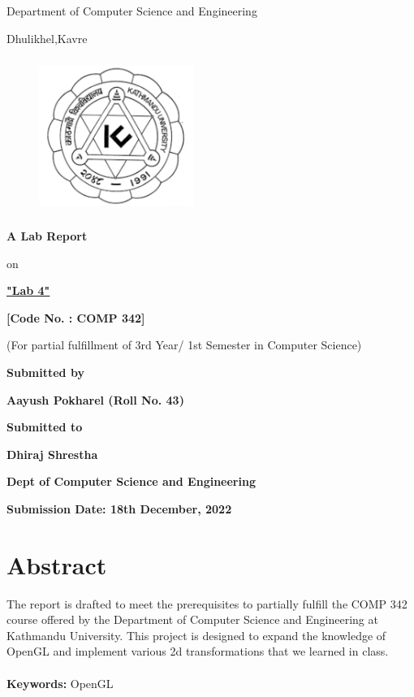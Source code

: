 \documentclass[12pt]{article}
\begin{document}
\thispagestyle{empty}

\section*{}
 {\LARGE{}}

\centerline{Department of Computer Science and Engineering}
\centerline{Dhulikhel,Kavre}
\begin{figure}[h]
    \centerline{\includegraphics[width=50.546mm,height=50.546mm]{KU_Logo.png}}
\end{figure}

\centerline{\textbf{A Lab Report}}
\centerline{on}
\centerline{\underline{\textbf{"Lab 4"}}}

\vspace*{12mm}

\centerline{\textbf{[Code No. : COMP 342]}}
\centerline{(For partial fulfillment of 3rd Year/ 1st Semester in Computer Science)}

\vspace*{20mm}

\centerline{\textbf{Submitted by}}
\centerline{\textbf{Aayush Pokharel (Roll No. 43)}}


\vspace*{26mm}


\centerline{\textbf{Submitted to}}
\centerline{\textbf{Dhiraj Shrestha}}
\centerline{\textbf{Dept of Computer Science and Engineering}}

\vspace*{20mm}

\centerline{\textbf{Submission Date: 18th December, 2022}}



\clearpage
\thispagestyle{empty}


\section*{Abstract}
The report is drafted to meet the prerequisites to partially fulfill the COMP 342 course offered by the
Department of Computer Science and Engineering at Kathmandu University. This project is designed
to expand the knowledge of OpenGL and implement various 2d transformations that we learned in class.
\\\\
\textbf{Keywords:} OpenGL
\end{document}
